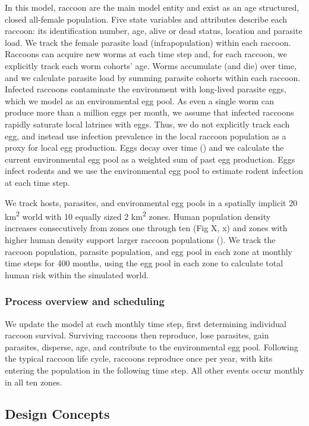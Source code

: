 \documentclass[11pt]{article}
\begin{document}
In this model, raccoon are the main model entity and exist as an age
structured, closed all-female population. Five state variables and
attributes describe each raccoon: its identification number, age, alive
or dead status, location and parasite load. We track the female parasite
load (infrapopulation) within each raccoon. Raccoons can acquire new
worms at each time step and, for each raccoon, we explicitly track each
worm cohorts' age. Worms accumulate (and die) over time, and we
calculate parasite load by summing parasite cohorts within each raccoon.
Infected raccoons contaminate the environment with long-lived parasite
eggs, which we model as an environmental egg pool. As even a single worm
can produce more than a million eggs per month, we assume that infected
raccoons rapidly saturate local latrines with eggs. Thus, we do not
explicitly track each egg, and instead use infection prevalence in the
local raccoon population as a proxy for local egg production. Eggs decay
over time () and we calculate the current environmental egg pool as a
weighted sum of past egg production. Eggs infect rodents and we use the
environmental egg pool to estimate rodent infection at each time step.

We track hosts, parasites, and environmental egg pools in a spatially
implicit 20 km\textsuperscript{2} world with 10 equally sized 2
km\textsuperscript{2} zones. Human population density increases
consecutively from zones one through ten (Fig X, x) and zones with
higher human density support larger raccoon populations (). We track the
raccoon population, parasite population, and egg pool in each zone at
monthly time steps for 400 months, using the egg pool in each zone to
calculate total human risk within the simulated world.

\subsubsection{Process overview and scheduling}

We update the model at each monthly time step, first determining
individual raccoon survival. Surviving raccoons then reproduce, lose
parasites, gain parasites, disperse, age, and contribute to the
environmental egg pool. Following the typical raccoon life cycle,
raccoons reproduce once per year, with kits entering the population in
the following time step. All other events occur monthly in all ten
zones.

\subsection{Design Concepts}
\end{document}
